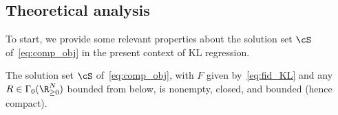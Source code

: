 \documentclass[11pt]{amsart}
\newcommand{\jc}[1]{{\color{red}#1}}
\begin{document}

\subsection{Theoretical analysis}\label{sec:KL_theory}
To start, we provide some relevant properties about the solution set $\cS$ of~\cref{eq:comp_obj} in the present context of KL regression.

\begin{lemma}\label{lem:sol set KL} The solution set $\cS$ of~\cref{eq:comp_obj}, with $F$ given by~\cref{eq:fid_KL} and any $R\in\Gamma_0(\R_{\geq 0}^N)$ bounded from below, is nonempty, closed, and bounded (hence compact).
\end{lemma}
\end{document}
